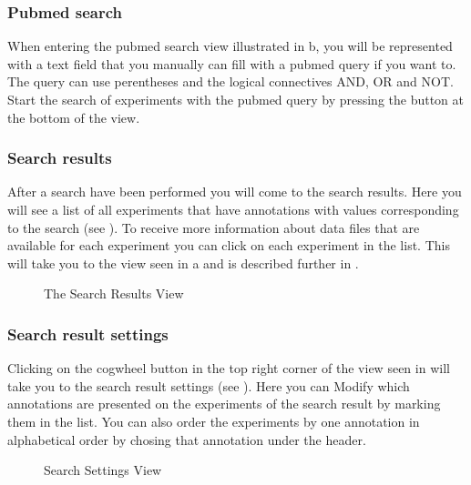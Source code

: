 \subsubsection{Pubmed search}
When entering the pubmed search view illustrated in b, you will be represented with a text field that you manually can fill with a pubmed query if you want to. The query can use perentheses and the logical connectives AND, OR and NOT. Start the search of experiments with the pubmed query by pressing the  button at the bottom of the view.


\subsubsection{Search results}
After a search have been performed you will come to the search results. Here you will see a list of all experiments that have
annotations with values corresponding to the search (see ). To receive more information about data files that are available for each experiment you can click on each experiment in the list. This will take you to the view seen in a and is described further in .

\begin{figure}[h]
\caption{The Search Results View}
\label{fig:and_search_results_man} 
\end{figure}
\FloatBarrier


\subsubsection{Search result settings}\label{sec:search_settings}
Clicking on the cogwheel button in the top right corner of the view seen in  will take you to the search result settings (see ). Here you can Modify which annotations are presented on the experiments of the search result by marking them in the list. You can also order the experiments by one annotation in alphabetical order by chosing that annotation under the  header.

\begin{figure}[ht]
\caption{Search Settings View}
\label{fig:and_search_settings_man}
\end{figure}
\FloatBarrier



